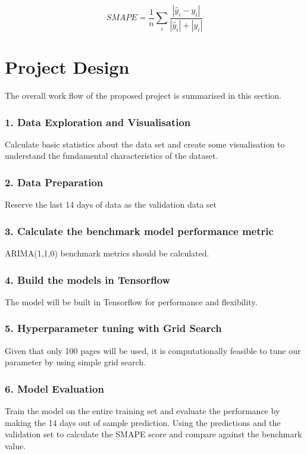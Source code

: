\documentclass[10pt, a4paper]{article}
\begin{document}
\begin{equation}
SMAPE = \frac{1}{n} \sum_{i} \frac{|{\hat{y}_i- y_i}|}{|\hat{y}_i|+|y_i|}
\end{equation}

\section{Project Design}
The overall work flow of the proposed project is summarised in this section.

\subsubsection*{1. Data Exploration and Visualisation}
Calculate basic statistics about the data set and create some visualisation to understand the fundamental characteristics of the dataset.

\subsubsection*{2. Data Preparation}
Reserve the last 14 days of data as the validation data set

\subsubsection*{3. Calculate the benchmark model performance metric}
ARIMA(1,1,0) benchmark metrics should be calculated.

\subsubsection*{4. Build the models in Tensorflow}
The model will be built in Tensorflow for performance and flexibility.

\subsubsection*{5. Hyperparameter tuning with Grid Search}
Given that only 100 pages will be used,  it is computationally feasible to tune our parameter by using simple grid search.

\subsubsection*{6. Model Evaluation}
Train the model on the entire training set and evaluate the performance by making the 14 days out of sample prediction. Using the predictions and the validation set to calculate the SMAPE score and compare against the benchmark value.


\printbibliography[title={Bibliography}] %

\end{document}
